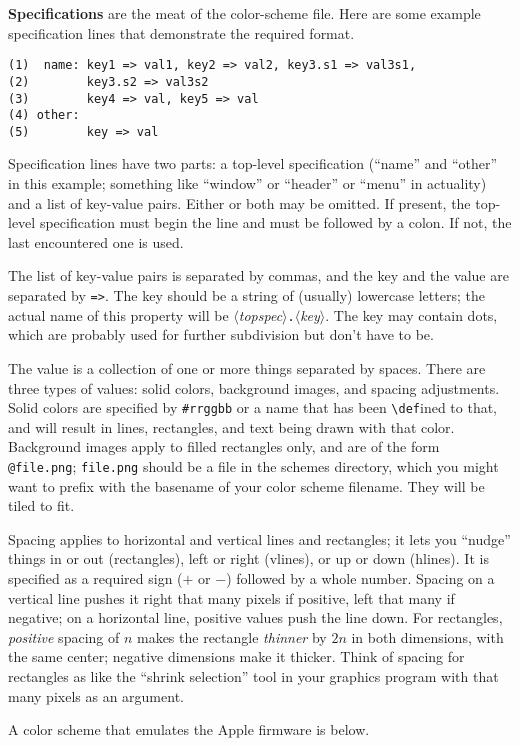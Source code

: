 \documentclass[12pt,letterpaper]{report}
\def\<#1>{\leavevmode\hbox{$\langle${\sl#1\/}$\rangle$}}
\begin{document}
{\bf Specifications} are the meat of the color-scheme file. Here are some example specification lines
that demonstrate the required format.
\begin{verbatim}
(1)  name: key1 => val1, key2 => val2, key3.s1 => val3s1,
(2)        key3.s2 => val3s2
(3)        key4 => val, key5 => val
(4) other:
(5)        key => val
\end{verbatim}
Specification lines have two parts: a top-level specification (``name'' and ``other'' in this example;
something like ``window'' or ``header'' or ``menu'' in actuality) and a list of key-value pairs. Either
or both may be omitted. If present, the top-level specification must begin the line and must be followed
by a colon. If not, the last encountered one is used.

The list of key-value pairs is separated by commas, and the key and the value are separated by \verb|=>|.
The key should be a string of (usually) lowercase letters; the actual name of this property will be
\<topspec>\verb|.|\<key>. The key may contain dots, which are probably used for further subdivision
but don't have to be.

The value is a collection of one or more things separated by spaces. There are three types of values:
solid colors, background images, and spacing adjustments. Solid colors are specified by \verb|#rrggbb|
or a name that has been \verb|\def|ined to that, and will result in lines, rectangles, and text being
drawn with that color. Background images apply to filled rectangles only, and are of the form \verb|@file.png|;
\verb|file.png| should be a file in the schemes directory, which you might want to prefix with the
basename of your color scheme filename. They will be tiled to fit.

Spacing applies to horizontal and vertical lines and rectangles; it lets you ``nudge'' things in or out
(rectangles), left or right (vlines), or up or down (hlines). It is specified as a required sign ($+$ or $-$)
followed by a whole number. Spacing on a vertical line pushes it right that many pixels if positive, left that
many if negative; on a horizontal line, positive values push the line down. For rectangles, {\it positive}
spacing of $n$ makes the rectangle {\it thinner} by $2n$ in both dimensions, with the same center; negative
dimensions make it thicker. Think of spacing for rectangles as like the ``shrink selection'' tool in your graphics program
with that many pixels as an argument.

A color scheme that emulates the Apple firmware is below.
\end{document}
